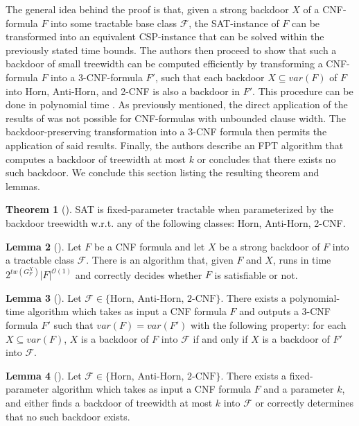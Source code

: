 \documentclass[11pt,a4paper]{article}
\theoremstyle{definition}
\theoremstyle{proposition}
\newtheorem{theorem}{Theorem}[section]
\newtheorem{lemma}[theorem]{Lemma}
\begin{document}
The general idea behind the proof is that, given a strong backdoor $X$ of a CNF-formula $F$ into some tractable base class $\mathcal{F}$, the SAT-instance of $F$ can be transformed into an equivalent CSP-instance that can be solved within the previously stated time bounds. The authors then proceed to show that such a backdoor of small treewidth can be computed efficiently by transforming a CNF-formula $F$ into a 3-CNF-formula $F'$, such that each backdoor $X \subseteq var(F)$ of $F$ into Horn, Anti-Horn, and 2-CNF is also a backdoor in $F'$. This procedure can be done in polynomial time \cite[p.28]{GanianBackdoorTreewidth}. As previously mentioned, the direct application of the results of \cite{GanianCSP} was not possible for CNF-formulas with unbounded clause width. The backdoor-preserving transformation into a 3-CNF formula then permits the application of said results. Finally, the authors describe an FPT algorithm that computes a backdoor of treewidth at most $k$ or concludes that there exists no such backdoor{\cite[p.29]{GanianBackdoorTreewidth}}. We conclude this section listing the resulting theorem and lemmas.  
\begin{theorem}[{\cite[Theorem 1, p.27]{GanianBackdoorTreewidth}}]
SAT is fixed-parameter tractable when parameterized by the backdoor treewidth w.r.t. any of the following classes: Horn, Anti-Horn, 2-CNF.
\end{theorem}

\begin{lemma}[{\cite[Lemma 1, p.27]{GanianBackdoorTreewidth}}]
Let $F$ be a CNF formula and let $X$ be a strong backdoor of $F$ into a tractable class $\mathcal{F}$. There is an algorithm that, given $F$ and $X$, runs in time $2^{tw(G_F^X)}|F|^{\mathcal{O}(1)}$ and correctly decides whether $F$ is satisfiable or not. 
\end{lemma}

\begin{lemma}[{\cite[Lemma 2, p.28]{GanianBackdoorTreewidth}}]
Let $\mathcal{F} \in \{\text{Horn, Anti-Horn, 2-CNF}\}$. There exists a polynomial-time algorithm which takes as input a CNF formula $F$ and outputs a 3-CNF formula $F'$ such that $var(F) = var(F')$ with the following property: for each $X \subseteq var(F)$, $X$ is a backdoor of $F$ into $\mathcal{F}$ if and only if $X$ is a backdoor of $F'$ into $\mathcal{F}$.
\end{lemma}

\begin{lemma}[{\cite[Lemma 3, p.29]{GanianBackdoorTreewidth}}]
Let $\mathcal{F} \in \{\text{Horn, Anti-Horn, 2-CNF}\}$. There exists a fixed-parameter algorithm which takes as input a CNF formula $F$ and a parameter $k$, and either finds a backdoor of treewidth at most $k$ into $\mathcal{F}$ or correctly determines that no such backdoor exists. 
\end{lemma}
\end{document}
